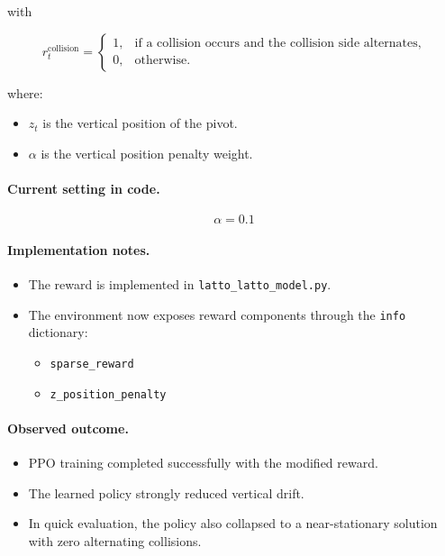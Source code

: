 \documentclass[11pt]{article}
\begin{document}
with

\[
r_t^{\mathrm{collision}} =
\begin{cases}
1, & \text{if a collision occurs and the collision side alternates}, \\
0, & \text{otherwise.}
\end{cases}
\]

where:
\begin{itemize}[leftmargin=1.5em]
  \item $z_t$ is the vertical position of the pivot.
  \item $\alpha$ is the vertical position penalty weight.
\end{itemize}

\paragraph{Current setting in code.}
\[
\alpha = 0.1
\]

\paragraph{Implementation notes.}
\begin{itemize}[leftmargin=1.5em]
  \item The reward is implemented in \texttt{latto\_latto\_model.py}.
  \item The environment now exposes reward components through the \texttt{info} dictionary:
  \begin{itemize}[leftmargin=1.5em]
    \item \texttt{sparse\_reward}
    \item \texttt{z\_position\_penalty}
  \end{itemize}
\end{itemize}

\paragraph{Observed outcome.}
\begin{itemize}[leftmargin=1.5em]
  \item PPO training completed successfully with the modified reward.
  \item The learned policy strongly reduced vertical drift.
  \item In quick evaluation, the policy also collapsed to a near-stationary solution with zero alternating collisions.
\end{itemize}
\end{document}
